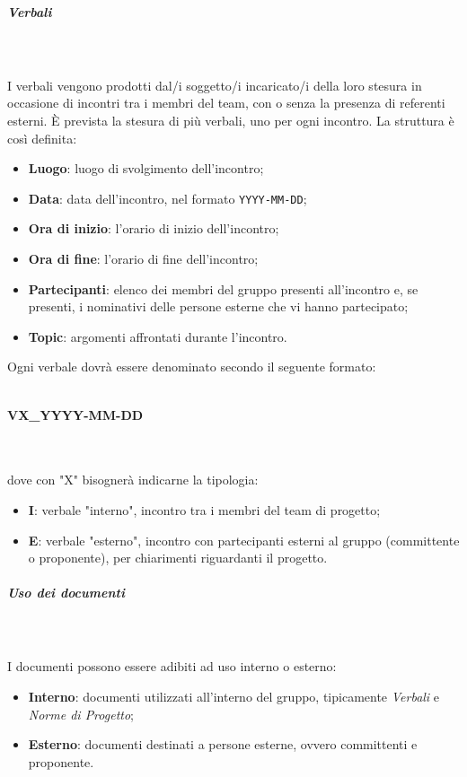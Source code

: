 \label{par:verbali}
\subparagraph{Verbali}\mbox{} \\ \mbox{} \\
I verbali vengono prodotti dal/i soggetto/i incaricato/i della loro stesura in occasione di incontri tra i membri del team, con o senza la presenza di referenti esterni. È prevista la stesura di più verbali, uno per ogni incontro.
La struttura è così definita: \begin{itemize}
\item \textbf{Luogo}: luogo di svolgimento dell'incontro;
\item \textbf{Data}: data dell'incontro, nel formato \texttt{YYYY-MM-DD};
\item \textbf{Ora di inizio}: l'orario di inizio dell'incontro;
\item \textbf{Ora di fine}: l'orario di fine dell'incontro;
\item \textbf{Partecipanti}: elenco dei membri del gruppo presenti all'incontro e, se presenti, i nominativi delle persone esterne che vi hanno partecipato;
\item \textbf{Topic}: argomenti affrontati durante l'incontro.
\end{itemize}
Ogni verbale dovrà essere denominato secondo il seguente formato: \\ \\
\centerline{\textbf{VX\_YYYY-MM-DD}} \\ \\
dove con "X" bisognerà indicarne la tipologia: \begin{itemize}
\item \textbf{I}: verbale "interno", incontro tra i membri del team di progetto;
\item \textbf{E}: verbale "esterno", incontro con partecipanti esterni al gruppo (committente o proponente), per chiarimenti riguardanti il progetto.
\end{itemize}

\subparagraph{Uso dei documenti}\mbox{} \\ \mbox{} \\
I documenti possono essere adibiti ad uso interno o esterno:
\begin{itemize}
\item \textbf{Interno}: documenti utilizzati all'interno del gruppo, tipicamente \textit{Verbali} e \textit{Norme di Progetto};
\item \textbf{Esterno}: documenti destinati a persone esterne, ovvero committenti e proponente.
\end{itemize}

